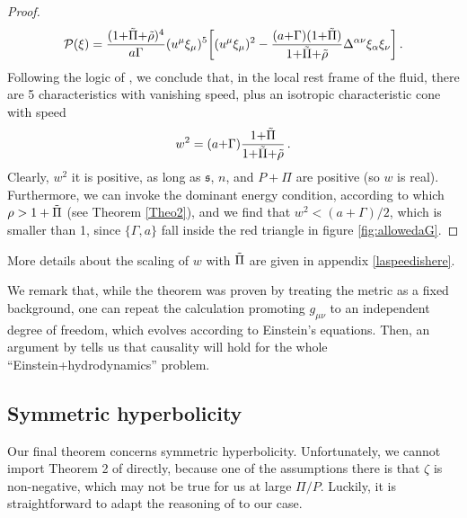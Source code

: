 \documentclass[a4paper, amsfonts, amssymb, amsmath, reprint, showkeys, nofootinbib, twoside,notitlepage,onecolumn]{revtex4-2}
\newcommand{\s}{{\mathfrak{s}}}
\theoremstyle{definition}
\theoremstyle{theorem}
\theoremstyle{corollary}
\begin{document}
\begin{proof}
\begin{equation}
\mathcal{P}(\xi)=\dfrac{(1{+}\Tilde{\Pi}{+}\Tilde{\rho})^4}{a\Gamma} (u^\mu \xi_\mu)^5\bigg[(u^\mu \xi_\mu)^2- \dfrac{(a{+}\Gamma)(1{+}\Tilde{\Pi})}{1{+}\Tilde{\Pi}{+}\Tilde{\rho}} \Delta^{\alpha \nu}\xi_\alpha \xi_\nu\bigg] \, .
\end{equation}
Following the logic of \cite{Causality_bulk}, we conclude that, in the local rest frame of the fluid, there are 5 characteristics with vanishing speed, plus an isotropic characteristic cone with speed
\begin{equation}\label{w2speed}
w^2 = (a{+}\Gamma)   \dfrac{1{+}\Tilde{\Pi}}{1{+}\Tilde{\Pi}{+}\Tilde{\rho}} \, . 
\end{equation}
Clearly, $w^2$ it is positive, as long as $\s$, $n$, and $P{+}\Pi$ are positive (so $w$ is real). Furthermore, we can invoke the dominant energy condition, according to which $\rho>1+\Tilde{\Pi}$ (see Theorem \ref{Theo2}), and we find that
$w^2<(a{+}\Gamma)/2$, which is smaller than 1, since $\{\Gamma,a\}$ fall inside the red triangle in figure \ref{fig:allowedaG}.    
\end{proof}
More details about the scaling of $w$ with $\Tilde{\Pi}$ are given in appendix \ref{laspeedishere}.

We remark that, while the theorem was proven by treating the metric as a fixed background, one can repeat the calculation promoting $g_{\mu \nu}$ to an independent degree of freedom, which evolves according to Einstein's equations. Then, an argument by \cite{Causality_bulk} tells us that causality will hold for the whole ``Einstein+hydrodynamics'' problem.



\vspace{-0.2cm}
\subsection{Symmetric hyperbolicity}
\vspace{-0.2cm}

Our final theorem concerns symmetric hyperbolicity. Unfortunately, we cannot import Theorem 2 of \cite{Causality_bulk} directly, because one of the assumptions there is that $\zeta$ is non-negative, which may not be true for us at large $\Pi/P$. Luckily, it is straightforward to adapt the reasoning of \cite{Causality_bulk} to our case.
\end{document}
